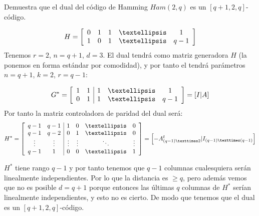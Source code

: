 \begin{problem}[15] Demuestra que el dual del código de Hamming $Ham(2,q)$
es un $[q+1,2,q]$-código.
\solution
{}

\[
	H = \left[
		\begin{array}{c c c c c}
			0 & 1 & 1 & … & 1\\
			1 & 0 & 1 & … & q-1
		\end{array}
	\right]
\]
Tenemos $r=2$, $n=q+1$, $d=3$. El dual tendrá como matriz generadora $H$ (la ponemos en forma estándar por comodidad), y por tanto el tendrá parámetros $n=q+1$, $k=2$, $r=q-1$:

\[
	G^* = \left[
		\begin{array}{c c | c c c}
			1 & 1 & 1 & … & 1\\
			0 & 1 & 1 & … & q-1
		\end{array}
	\right] = \left[ I | A \right]
\]
Por tanto la matriz controladora de paridad del dual será:
\[
	H^* = \left[
		\begin{array}{c c | c c c c}
			q-1 & q-1 & 1 & 0 & … & 0\\
			q-1 & q-2 & 0 & 1 & … & 0\\
			\vdots & \vdots & \vdots & \vdots & \ddots & \vdots\\
			q-1 & 1 & 0 & 0 & … & 1
		\end{array}
	\right] = \left[ -A^t_{(q-1)×2} | I_{(q-1)×(q-1)} \right]
\]

$H^*$ tiene rango $q-1$ y por tanto tenemos que $q-1$ columnas cualesquiera serán linealmente independientes. Por lo que la distancia es $≥q$, pero además vemos que no es posible $d=q+1$ porque entonces las últimas $q$ columnas de $H^*$ serían linealmente independientes, y esto no es cierto. De modo que tenemos que el dual es un $[q+1,2,q]$-código.

\end{problem}


